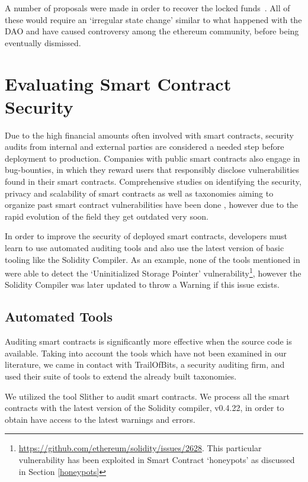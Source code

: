 A number of proposals were made in order to recover the locked funds~\cite{eip867, eip999}. All of these would require an `irregular state change' similar to what happened with the DAO and have caused controversy among the ethereum community, before being eventually dismissed.


\section{Evaluating Smart Contract Security}
Due to the high financial amounts often involved with smart contracts, security audits from internal and external parties are considered a needed step before deployment to production. Companies with public smart contracts also engage in bug-bounties, in which they reward users that responsibly disclose vulnerabilities found in their smart contracts. Comprehensive studies on identifying the security, privacy and scalability of smart contracts \cite{DBLP:journals/corr/abs-1710-06372} as well as taxonomies aiming to organize past smart contract vulnerabilities have been done \cite{Atzei:2017:SAE:3080353.3080363,tools}, however due to the rapid evolution of the field they get outdated very soon. 

In order to improve the security of deployed smart contracts, developers must learn to use automated auditing tools and also use the latest version of basic tooling like the Solidity Compiler. As an example, none of the tools mentioned in \cite{tools} were able to detect the `Uninitialized Storage Pointer' vulnerability\footnote{\url{https://github.com/ethereum/solidity/issues/2628}. This particular vulnerability has been exploited in Smart Contract `honeypots' as discussed in Section \ref{honeypots}}, however the Solidity Compiler was later updated to throw a Warning if this issue exists. 

\subsection{Automated Tools}\label{slither}

Auditing smart contracts is significantly more effective when the source code is available. Taking into account the tools which have not been examined in our literature, we came in contact with TrailOfBits, a security auditing firm, and used their suite of tools to extend the already built taxonomies.

We utilized the tool Slither %
to audit smart contracts. We process all the smart contracts with the latest version of the Solidity compiler, v0.4.22, in order to obtain have access to the latest warnings and errors. 

